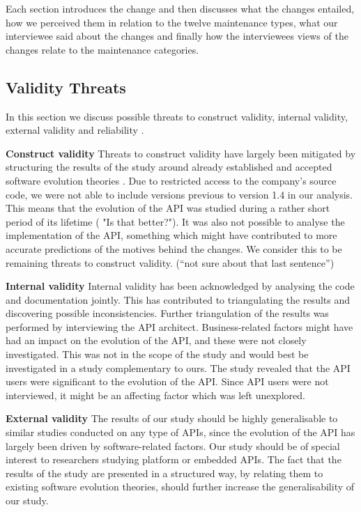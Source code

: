 \documentclass{sig-alternate}
\begin{document}
Each section introduces the change and then discusses what the changes entailed, how we perceived them in relation to the twelve maintenance types, what our interviewee said about the changes and finally how the interviewees views of the changes relate to the maintenance categories. 


\subsection{Validity Threats} \label{validity_threats}
In this section we discuss possible threats to construct validity, internal validity, external validity and reliability \cite{runeson2009guidelines}.

\smallskip \noindent
\textbf{Construct validity  } Threats to construct validity have largely been mitigated by structuring the results of the study around already established and accepted software evolution theories \cite{chapin2001types} \cite{lehman1980programs}. Due to restricted access to the company's source code, we were not able to include versions previous to version 1.4 in our analysis. This means that the evolution of the API was studied during a rather short period of its lifetime ( "Is that better?"). It was also not possible to analyse the implementation of the API, something which might have contributed to more accurate predictions of the motives behind the changes. We consider this to be remaining threats to construct validity. (``not sure about that last sentence'')


\smallskip \noindent
\textbf{Internal validity  } Internal validity has been acknowledged by analysing the code and documentation jointly. This has contributed to triangulating the results and discovering possible inconsistencies. Further triangulation of the results was performed by interviewing the API architect. Business-related factors might have had an impact on the evolution of the API, and these were not closely investigated. This was not in the scope of the study and would best be investigated in a study complementary to ours. The study revealed that the API users were significant to the evolution of the API. Since API users were not interviewed, it might be an affecting factor which was left unexplored. 


\smallskip \noindent
\textbf{External validity  } The results of our study should be highly generalisable to similar studies conducted on any type of APIs, since the evolution of the API has largely been driven by software-related factors. Our study should be of special interest to researchers studying platform or embedded APIs. The fact that the results of the study are presented in a structured way, by relating them to existing software evolution theories, should further increase the generalisability of our study.
\end{document}
